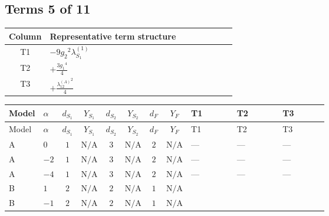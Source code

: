 \documentclass[8pt]{article}
\begin{document}
\begin{landscape}
\subsection*{Terms 5 of 11}
\begin{center}
\begin{tabular}{@{}c >{\raggedright\arraybackslash}p{0.82\linewidth}@{}}
\toprule
Column & Representative term structure \\
\midrule
T1 & \(\displaystyle -9 {g_2}^2 {\lambda_{S_1}^{(1)}}\) \\
\midrule
T2 & \(\displaystyle +\frac{3 {g_1}^4}{4}\) \\
\midrule
T3 & \(\displaystyle +\frac{{\lambda_{12}^{(A)}}^2}{4}\) \\
\midrule
\bottomrule
\end{tabular}
\end{center}
\smallskip
\tiny
\begin{longtable}{@{}llcccccc >{\raggedright\arraybackslash}p{0.21\linewidth} >{\raggedright\arraybackslash}p{0.21\linewidth} >{\raggedright\arraybackslash}p{0.21\linewidth}@{}}
\toprule
Model & $\alpha$ & $d_{S_1}$ & $Y_{S_1}$ & $d_{S_2}$ & $Y_{S_2}$ & $d_F$ & $Y_F$ & T1 & T2 & T3 \\
\midrule
\endfirsthead
\toprule
Model & $\alpha$ & $d_{S_1}$ & $Y_{S_1}$ & $d_{S_2}$ & $Y_{S_2}$ & $d_F$ & $Y_F$ & T1 & T2 & T3 \\
\midrule
\endhead
A & $0$ & $1$ & $\text{N/A}$ & $3$ & $\text{N/A}$ & $2$ & $\text{N/A}$ & --- & --- & --- \\
\midrule
A & $-2$ & $1$ & $\text{N/A}$ & $3$ & $\text{N/A}$ & $2$ & $\text{N/A}$ & --- & --- & --- \\
\midrule
A & $-4$ & $1$ & $\text{N/A}$ & $3$ & $\text{N/A}$ & $2$ & $\text{N/A}$ & --- & --- & --- \\
\midrule
B & $1$ & $2$ & $\text{N/A}$ & $2$ & $\text{N/A}$ & $1$ & $\text{N/A}$ & \scriptsize\adjustbox{max width=\linewidth}{$\begin{gathered} -9 {g_2}^2 {\lambda_{S_1}^{(1)}}\end{gathered}$} & \scriptsize\adjustbox{max width=\linewidth}{$\begin{gathered} +\frac{3 {g_1}^4}{4}\end{gathered}$} & \scriptsize\adjustbox{max width=\linewidth}{$\begin{gathered} +\frac{{\lambda_{12}^{(A)}}^2}{4}\end{gathered}$} \\
\midrule
B & $-1$ & $2$ & $\text{N/A}$ & $2$ & $\text{N/A}$ & $1$ & $\text{N/A}$ & \scriptsize\adjustbox{max width=\linewidth}{$\begin{gathered} -9 {g_2}^2 {\lambda_{S_1}^{(1)}}\end{gathered}$} & \scriptsize\adjustbox{max width=\linewidth}{$\begin{gathered} +\frac{3 {g_1}^4}{4}\end{gathered}$} & \scriptsize\adjustbox{max width=\linewidth}{$\begin{gathered} +\frac{{\lambda_{12}^{(A)}}^2}{4}\end{gathered}$} \\

\end{longtable}
\end{landscape}
\end{document}
